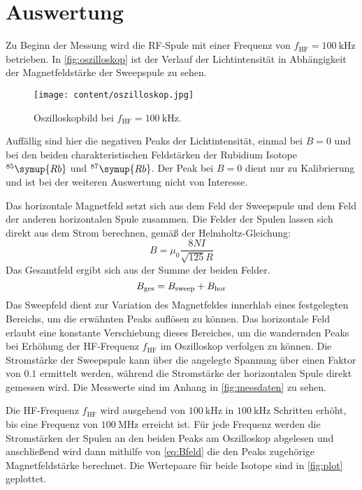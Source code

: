 \section{Auswertung}
\label{sec:Auswertung}

Zu Beginn der Messung wird die RF-Spule mit einer Frequenz von $f_{\text{HF}}=\qty{100}{\kilo\hertz}$ betrieben.
In \autoref{fig:oszilloskop} ist der Verlauf der Lichtintensität in Abhängigkeit der Magnetfeldstärke der Sweepspule
zu sehen.

\begin{figure} [H]
  \centering
  \texttt{[image: content/oszilloskop.jpg]}
  \caption{Oszilloskopbild bei $f_{\text{HF}}=\qty{100}{\kilo\hertz}$.}
  \label{fig:oszilloskop}
\end{figure}

Auffällig sind hier die negativen Peaks der Lichtintensität, einmal bei $B=0$ und bei den beiden charakteristischen
Feldstärken der Rubidium Isotope $^{85}\symup{Rb}$ und $^{87}\symup{Rb}$.
Der Peak bei $B=0$ dient nur zu Kalibrierung und ist bei der weiteren Auswertung nicht von Interesse.

Das horizontale Magnetfeld setzt sich aus dem Feld der Sweepspule und dem Feld der anderen horizontalen Spule
zusammen. Die Felder der Spulen lassen sich direkt aus dem Strom berechnen, gemäß der Helmholtz-Gleichung:
\begin{equation}
  B =\mu_0 \frac{8NI}{\sqrt{125}R}
  \label{eq:Bfeld}
\end{equation}
Das Gesamtfeld ergibt sich aus der Summe der beiden Felder.
\begin{equation}
  B_{\text{ges}} = B_{\text{sweep}} + B_{\text{hor}}
  \notag
\end{equation}
Das Sweepfeld dient zur Variation des Magnetfeldes innerhlab eines festgelegten Bereichs, um die erwähnten Peaks auflösen zu können.
Das horizontale Feld erlaubt eine konstante Verschiebung dieses Bereiches, um die wandernden Peaks bei Erhöhung der HF-Frequenz
$f_{\text{HF}}$ im Oszilloskop verfolgen zu können.
Die Stromstärke der Sweepspule kann über die angelegte Spannung über einen Faktor von $0.1$ ermittelt werden, während die
Stromstärke der horizontalen Spule direkt gemessen wird. Die Messwerte sind im Anhang in \autoref{fig:messdaten} zu sehen.

Die HF-Frequenz $f_{\text{HF}}$ wird ausgehend von $\qty{100}{\kilo\hertz}$ in $\qty{100}{\kilo\hertz}$ Schritten erhöht,
bis eine Frequenz von $\qty{100}{\mega\hertz}$ erreicht ist.
Für jede Frequenz werden die Stromstärken der Spulen an den beiden Peaks am Oszilloskop abgelesen und anschließend wird
dann mithilfe von \eqref{eq:Bfeld} die den Peaks zugehörige Magnetfeldstärke berechnet.
Die Wertepaare für beide Isotope sind in \autoref{fig:plot} geplottet.

